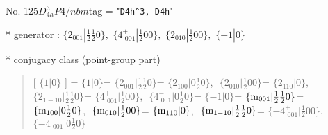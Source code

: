 \documentclass[fleqn,10pt,landscape]{jsarticle}
\begin{document}
\newpage

No. 125\quad$D_{4h}^{3}$\quad$P4/nbm$\quad[ tetragonal ]
tag = "{\tt D4h^3, D4h}"

* generator : $\{2{}_{001}|\frac{1}{2} \frac{1}{2} 0\},\,\,\{4^{+}_{\,\,001}|\frac{1}{2} 0 0\},\,\,\{2{}_{010}|\frac{1}{2} 0 0\},\,\,\{-1|0\}$

* conjugacy class (point-group part)
\begin{quote}
[ $\{1|0\}$ ] = \quad $\{1|0\}$ = \quad $\{2{}_{001}|\frac{1}{2} \frac{1}{2} 0\}$\newline[ $\{2{}_{100}|0 \frac{1}{2} 0\}$ ] = \quad $\{2{}_{100}|0 \frac{1}{2} 0\}$,\,\, $\{2{}_{010}|\frac{1}{2} 0 0\}$\newline[ $\{2{}_{110}|0\}$ ] = \quad $\{2{}_{110}|0\}$,\,\, $\{2{}_{1-10}|\frac{1}{2} \frac{1}{2} 0\}$\newline[ $\{4^{+}_{\,\,001}|\frac{1}{2} 0 0\}$ ] = \quad $\{4^{+}_{\,\,001}|\frac{1}{2} 0 0\}$,\,\, $\{4^{-}_{\,\,001}|0 \frac{1}{2} 0\}$\newline[ $\{-1|0\}$ ] = \quad $\{-1|0\}$ = \quad $\{{\rm m}_{001}|\frac{1}{2} \frac{1}{2} 0\}$\newline[ $\{{\rm m}_{100}|0 \frac{1}{2} 0\}$ ] = \quad $\{{\rm m}_{100}|0 \frac{1}{2} 0\}$,\,\, $\{{\rm m}_{010}|\frac{1}{2} 0 0\}$\newline[ $\{{\rm m}_{110}|0\}$ ] = \quad $\{{\rm m}_{110}|0\}$,\,\, $\{{\rm m}_{1-10}|\frac{1}{2} \frac{1}{2} 0\}$\newline[ $\{-4^{+}_{\,\,001}|\frac{1}{2} 0 0\}$ ] = \quad $\{-4^{+}_{\,\,001}|\frac{1}{2} 0 0\}$,\,\, $\{-4^{-}_{\,\,001}|0 \frac{1}{2} 0\}$\newline
\end{quote}
\end{document}

